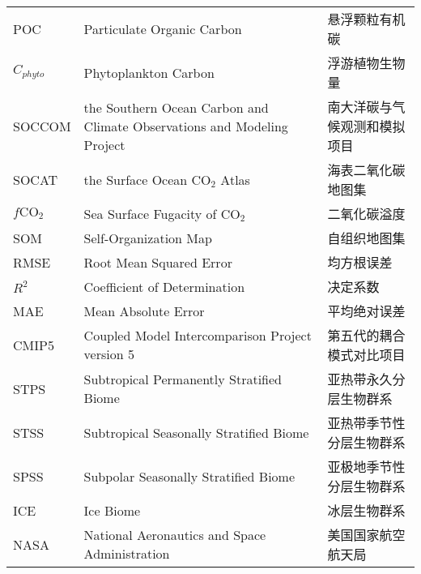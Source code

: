 \begin{center}
\begin{longtable}{m{3cm}<{\centering}m{7cm}<{\centering}m{5cm}<{\centering}}
        POC                                              &Particulate Organic Carbon                        &悬浮颗粒有机碳\\
        $C_{phyto}$                                      &Phytoplankton Carbon                              &浮游植物生物量\\
        SOCCOM                                           & the Southern Ocean Carbon and Climate Observations and Modeling Project        
                                                                                                            &南大洋碳与气候观测和模拟项目\\
        SOCAT                                            &the Surface Ocean $\mathrm{CO_2}$ Atlas           & 海表二氧化碳地图集\\
        $f\mathrm{CO_2}$                                 &Sea Surface Fugacity of $\mathrm{CO_2}$           & 二氧化碳溢度\\
        SOM                                              &Self-Organization Map                             & 自组织地图集\\
        RMSE                                             &Root Mean Squared Error                           &均方根误差\\
        $R^2$                                            &Coefficient of Determination                       &决定系数\\
        MAE                                              &Mean Absolute Error                               &平均绝对误差\\
        CMIP5                                            &Coupled Model Intercomparison Project version 5   &第五代的耦合模式对比项目\\
        STPS                                             &Subtropical Permanently Stratified Biome          &亚热带永久分层生物群系\\
        STSS                                             &Subtropical Seasonally Stratified Biome           &亚热带季节性分层生物群系 \\
        SPSS                                             &Subpolar Seasonally Stratified Biome              &亚极地季节性分层生物群系\\
        ICE                                              &Ice Biome                                         &冰层生物群系\\
        NASA                                             &National Aeronautics and Space Administration     &美国国家航空航天局\\

\end{longtable}
\end{center}

